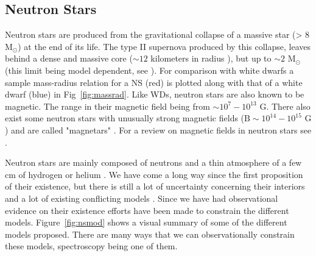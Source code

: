 \subsection{Neutron Stars}\label{sec:ns}

Neutron stars are produced from the gravitational collapse of a massive star (> 8 M$_\odot$)\citep{de2008stars} at the end of its life. The type II supernova produced by this collapse, leaves behind a dense and massive core ($\sim 12$ kilometers in radius \citep{de2008stars}), but up to $\sim 2$ M$_\odot$ (this limit being model dependent, see \cite{lattimer_neutron_2007}). For comparison with white dwarfs a sample mass-radius relation for a NS (red) is plotted along with that of a white dwarf (blue) in Fig~\ref{fig:massrad}. Like WDs, neutron stars are also known to be magnetic. The range in their magnetic field being from $\sim 10^7 - 10^{13}$ G. There also exist some neutron stars with unusually strong magnetic fields ($\text{B}\sim 10^{14} - 10^{15}\text{ G}$) and are called "magnetars" \citep{duncan_formation_1992}. For a review on magnetic fields in neutron stars see \cite{reisenegger_magnetic_2005}. 


Neutron stars are mainly composed of neutrons and a thin atmosphere of a few cm of hydrogen or helium \citep{zavlin_ns_1996}. We have come a long way since the first proposition of their existence, but there is still a lot of  uncertainty concerning their interiors and a lot of existing conflicting models \citep{lattimer_neutron_2007}. Since we have had observational evidence on their existence \citep{hewish_pulsar_1968} efforts have been made to constrain the different models. Figure~\ref{fig:nsmod} shows a visual summary of some of the different models proposed. There are many ways that we can observationally constrain these models, spectroscopy being one of them.

